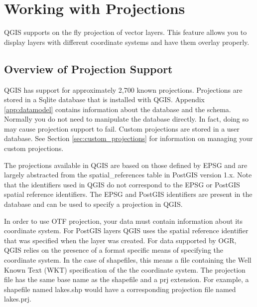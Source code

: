 \chapter{Working with Projections}
QGIS supports on the fly projection of vector layers. This feature allows you
to display layers with different coordinate systems and have them overlay
properly. 
\section{Overview of Projection Support}
QGIS has support for approximately 2,700 known projections. 
Projections are stored in a Sqlite database that is installed with QGIS.
Appendix \ref{app:datamodel}  contains information about the database and the
schema. Normally you do not need to manipulate the database directly. In fact,
doing so may cause projection support to fail. Custom projections are
stored in a user database. See Section \ref{sec:custom_projections} for
information on managing your custom projections.

The projections available in QGIS are based on those defined by EPSG and are
largely abstracted from the spatial\_references table in PostGIS version 1.x.
Note that the identifiers used in QGIS do not correspond to the EPSG or
PostGIS spatial reference identifiers. The EPSG and PostGIS identifiers are
present in the database and can be used to specify a projection in QGIS.

In order to use OTF projection, your data must contain information about its
coordinate system. For PostGIS layers QGIS uses the spatial reference
identifier that was specified when the layer was created. For data supported
by OGR, QGIS relies on the presence of a format specific means of specifying
the coordinate system. In the case of shapefiles, this means a file containing
the Well Known Text (WKT) specification of the the coordinate system. The
projection file has the same base name as the shapefile and a prj extension.
For example, a shapefile named lakes.shp would have a corresponding projection
file named lakes.prj.


